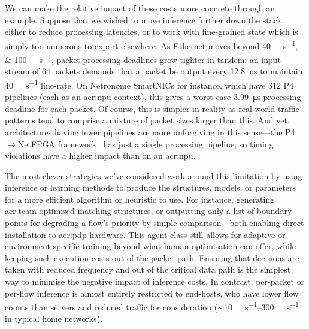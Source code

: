 We can make the relative impact of these costs more concrete through an example.
Suppose that we wished to move inference further down the stack, either to reduce processing latencies, or to work with fine-grained state which is simply too numerous to export elsewhere.
As Ethernet moves beyond \qtylist{40;100}{\giga\bit\per\second}, packet processing deadlines grow tighter in tandem; an input stream of \qty{64}{\byte} packets demands that a packet be output every \qty{12.8}{\nano\second} to maintain \qty{40}{\giga\bit\per\second} line-rate.
On Netronome SmartNICs for instance, which have \num{312} P4 pipelines (each as an \gls{acr:npu} context), this gives a worst-case \qty{3.99}{\micro\second} processing deadline for each packet.
Of course, this is simpler in reality as real-world traffic patterns tend to comprise a mixture of packet sizes larger than this.
And yet, architectures having fewer pipelines are more unforgiving in this sense---the P4$\rightarrow$NetFPGA framework~\parencite{DBLP:conf/fpga/IbanezBMZ19} has just a single processing pipeline, so timing violations have a higher impact than on an \gls{acr:npu}.

The most clever strategies we've considered work around this limitation by using inference or learning methods to produce the structures, models, or parameters for a more efficient algorithm or heuristic to use.
For instance, generating \gls{acr:tcam}-optimised matching structures, or outputting only a list of boundary points for degrading a flow's priority by simple comparison---both enabling direct installation to \gls{acr:pdp} hardware.
This agent class still allows for adaptive or environment-specific training beyond what human optimisation can offer, while keeping such execution costs out of the packet path.
Ensuring that decisions are taken with reduced frequency and out of the critical data path is the simplest way to minimise the negative impact of inference costs.
In contrast, per-packet or per-flow inference is almost entirely restricted to end-hosts, who have lower flow counts than servers and reduced traffic for consideration ($\sim$\qtyrange{10}{300}{\mega\bit\per\second} in typical home networks).


